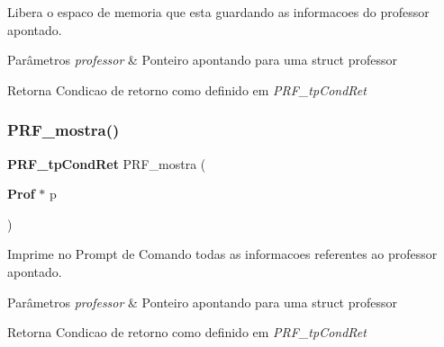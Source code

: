 Libera o espaco de memoria que esta guardando as informacoes do professor apontado. 


\begin{DoxyParams}{Parâmetros}
{\em professor} & Ponteiro apontando para uma struct professor \\
\hline
\end{DoxyParams}
\begin{DoxyReturn}{Retorna}
Condicao de retorno como definido em {\itshape P\+R\+F\+\_\+tp\+Cond\+Ret} 
\end{DoxyReturn}
\mbox{\label{group__modulo_professor_ga3d99b46f6a543825e8fb02d8342ac8f6}} 
\subsubsection{P\+R\+F\+\_\+mostra()}
{\footnotesize\ttfamily \textbf{ P\+R\+F\+\_\+tp\+Cond\+Ret} P\+R\+F\+\_\+mostra (\begin{DoxyParamCaption}\item[{\textbf{ Prof} $\ast$}]{p }\end{DoxyParamCaption})}



Imprime no Prompt de Comando todas as informacoes referentes ao professor apontado. 


\begin{DoxyParams}{Parâmetros}
{\em professor} & Ponteiro apontando para uma struct professor \\
\hline
\end{DoxyParams}
\begin{DoxyReturn}{Retorna}
Condicao de retorno como definido em {\itshape P\+R\+F\+\_\+tp\+Cond\+Ret} 
\end{DoxyReturn}
